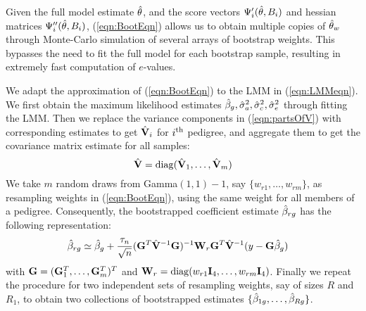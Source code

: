 Given the full model estimate $\hat {{\theta}}$, and the score vectors $ \Psi_i' (\hat {{\theta}}, B_i)$ and hessian matrices $ \Psi_i'' (\hat {{\theta}}, B_i)$, (\ref{eqn:BootEqn}) allows us to obtain multiple copies of $\hat {{\theta}}_w$ through Monte-Carlo simulation of several arrays of bootstrap weights. This bypasses the need to fit the full model for each bootstrap sample, resulting in extremely fast computation of $e$-values.

We adapt the approximation of (\ref{eqn:BootEqn}) to the LMM in (\ref{eqn:LMMeqn}). We first obtain the maximum likelihood estimates $\hat {{\beta}}_g, \hat \sigma_a^2, \hat \sigma_c^2, \hat \sigma_e^2$ through fitting the LMM. Then we replace the variance components in (\ref{eqn:partsOfV}) with corresponding estimates to get $\hat {{\mathbf{V}}}_i$ for $i^{\operatorname*{th}}$ pedigree, and aggregate them to get the covariance matrix estimate for all samples:
%
$$
\hat {{\mathbf{V}}} = {\mathrm {diag}} ( \hat {{\mathbf{V}}}_1, \ldots, \hat {{\mathbf{V}}}_m )
$$
%
We take $m$ random draws from Gamma$(1,1) - 1$, say $\{ w_{r1}, \ldots, w_{rm} \}$, as resampling weights in (\ref{eqn:BootEqn}), using the same weight for all members of a pedigree. Consequently, the bootstrapped coefficient estimate $\hat {{\beta}}_{r g}$ has the following representation:
%
\begin{align}
\hat {{\beta}}_{r g} & \simeq \hat {{\beta}}_g + \frac{ \tau_n}{\sqrt n} ( {\mathbf{G}}^T \hat {{\mathbf{V}}}^{-1} {\mathbf{G}} )^{-1}
{\mathbf{W}}_r {\mathbf{G}}^T \hat {{\mathbf{V}}}^{-1} ( {y} - {\mathbf{G}} \hat {{\beta}}_g)
\end{align}
%
with ${\mathbf{G}} = ( {\mathbf{G}}_1^T, \ldots, {\mathbf{G}}_m^T )^T$ and ${\mathbf{W}}_r = {\mathrm {diag}} (w_{r1} {\mathbf{I}}_4, \ldots, w_{r m} {\mathbf{I}}_4 )$. Finally we repeat the procedure for two independent sets of resampling weights, say of sizes $R$ and $R_1$, to obtain two collections of bootstrapped estimates $\{ \hat {{\beta}}_{1g}, \ldots, \hat {{\beta}}_{Rg} \}$.



